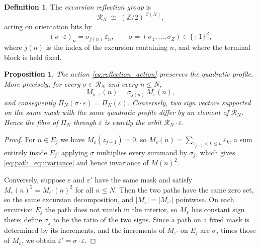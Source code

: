 \documentclass[11pt]{amsart}
\numberwithin{equation}{section}
\theoremstyle{plain}
\newtheorem{proposition}[theorem]{Proposition}
\theoremstyle{definition}
\newtheorem{definition}[theorem]{Definition}
\theoremstyle{remark}
\begin{document}
\begin{definition}
\label{def:reflection_group}
The \emph{excursion reflection group} is
\begin{equation}
\mathcal{R}_N \;\cong\; (\mathbb{Z}/2)^{\,Z(N)},
\label{eq:reflection_group}
\end{equation}
acting on orientation bits by
\begin{equation}
(\sigma \cdot \varepsilon)_n = \sigma_{j(n)}\, \varepsilon_n,
\qquad \sigma = (\sigma_1,\dots,\sigma_Z) \in \{\pm 1\}^{Z},
\label{eq:reflection_action}
\end{equation}
where $j(n)$ is the index of the excursion containing $n$, and where
the terminal block is held fixed.
\end{definition}

\begin{proposition}
\label{prop:reflection_fibre}
The action \eqref{eq:reflection_action} preserves the quadratic
profile. More precisely, for every
$\sigma \in \mathcal{R}_N$ and every $n \le N$,
\begin{equation}
M_{\sigma \cdot \varepsilon}(n) = \sigma_{j(n)}\, M_\varepsilon(n),
\label{eq:path_equivariance}
\end{equation}
and consequently
$\Pi_N(\sigma\cdot\varepsilon) = \Pi_N(\varepsilon)$. Conversely, two
sign vectors supported on the same mask with the same quadratic profile
differ by an element of $\mathcal{R}_N$. Hence the fibre of $\Pi_N$
through $\varepsilon$ is exactly the orbit
$\mathcal{R}_N \cdot \varepsilon$.
\end{proposition}

\begin{proof}
For $n \in E_j$ we have $M_\varepsilon(z_{j-1}) = 0$, so
$M_\varepsilon(n) = \sum_{z_{j-1} < k \le n} \varepsilon_k$, a sum
entirely inside $E_j$; applying $\sigma$ multiplies every summand by
$\sigma_j$, which gives \eqref{eq:path_equivariance} and hence
invariance of $M(n)^2$.

Conversely, suppose $\varepsilon$ and $\varepsilon'$ have the same mask
and satisfy $M_{\varepsilon}(n)^2 = M_{\varepsilon'}(n)^2$ for all
$n \le N$. Then the two paths have the same zero set, so the same
excursion decomposition, and $|M_\varepsilon| = |M_{\varepsilon'}|$
pointwise. On each excursion $E_j$ the path does not vanish in the
interior, so $M_\varepsilon$ has constant sign there; define $\sigma_j$
to be the ratio of the two signs. Since a path on a fixed mask is
determined by its increments, and the increments of
$M_{\varepsilon'}$ on $E_j$ are $\sigma_j$ times those of
$M_\varepsilon$, we obtain $\varepsilon' = \sigma \cdot \varepsilon$.
\end{proof}
\end{document}
